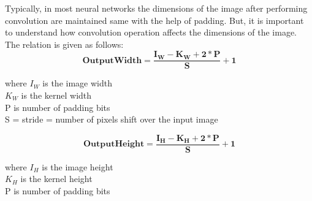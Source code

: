 \documentclass{IEEEtran}
\begin{document}
Typically, in most neural networks the dimensions of the image after performing convolution are maintained same with the help of padding. But, it is important to understand how convolution operation affects the dimensions of the image. The relation is given as follows:
\begin{equation*}
	\boldsymbol{Output Width = \frac{I_W - K_W + 2*P}{S} + 1}
\end{equation*}
\begin{center}
where  $I_W$ is the image width \\
$K_W$ is the kernel width	\\	
P is number of padding bits	\\
S = stride = number of pixels shift over the input image
\end{center}
\begin{equation*}
	\boldsymbol{Output Height = \frac{I_H - K_H + 2*P}{S} + 1}
\end{equation*}
\begin{center}
where  $I_H$ is the image height \\
$K_H$ is the kernel height	\\	
P is number of padding bits
\end{center}
\end{document}
